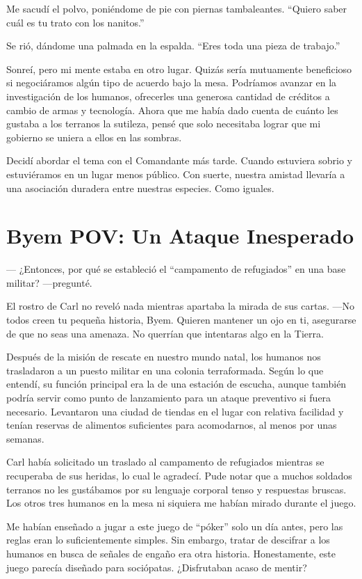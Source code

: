\documentclass[spanish,12pt,a4paper,oneside,titlepage]{book}
\begin{document}
    Me sacudí el polvo, poniéndome de pie con piernas tambaleantes. ``Quiero saber cuál es tu trato con los nanitos.''

    Se rió, dándome una palmada en la espalda. ``Eres toda una pieza de trabajo.''

    Sonreí, pero mi mente estaba en otro lugar. Quizás sería mutuamente beneficioso si negociáramos algún tipo de acuerdo bajo la mesa. Podríamos avanzar en la investigación de los humanos, ofrecerles una generosa cantidad de créditos a cambio de armas y tecnología. Ahora que me había dado cuenta de cuánto les gustaba a los terranos la sutileza, pensé que solo necesitaba lograr que mi gobierno se uniera a ellos en las sombras.

    Decidí abordar el tema con el Comandante más tarde. Cuando estuviera sobrio y estuviéramos en un lugar menos público. Con suerte, nuestra amistad llevaría a una asociación duradera entre nuestras especies. Como iguales.

    \chapter{Byem POV: Un Ataque Inesperado}

    — ¿Entonces, por qué se estableció el ``campamento de refugiados'' en una base militar? —pregunté.

    El rostro de Carl no reveló nada mientras apartaba la mirada de sus cartas. —No todos creen tu pequeña historia, Byem. Quieren mantener un ojo en ti, asegurarse de que no seas una amenaza. No querrían que intentaras algo en la Tierra.

    Después de la misión de rescate en nuestro mundo natal, los humanos nos trasladaron a un puesto militar en una colonia terraformada. Según lo que entendí, su función principal era la de una estación de escucha, aunque también podría servir como punto de lanzamiento para un ataque preventivo si fuera necesario. Levantaron una ciudad de tiendas en el lugar con relativa facilidad y tenían reservas de alimentos suficientes para acomodarnos, al menos por unas semanas.

    Carl había solicitado un traslado al campamento de refugiados mientras se recuperaba de sus heridas, lo cual le agradecí. Pude notar que a muchos soldados terranos no les gustábamos por su lenguaje corporal tenso y respuestas bruscas. Los otros tres humanos en la mesa ni siquiera me habían mirado durante el juego.

    Me habían enseñado a jugar a este juego de ``póker'' solo un día antes, pero las reglas eran lo suficientemente simples. Sin embargo, tratar de descifrar a los humanos en busca de señales de engaño era otra historia. Honestamente, este juego parecía diseñado para sociópatas. ¿Disfrutaban acaso de mentir?
\end{document}
